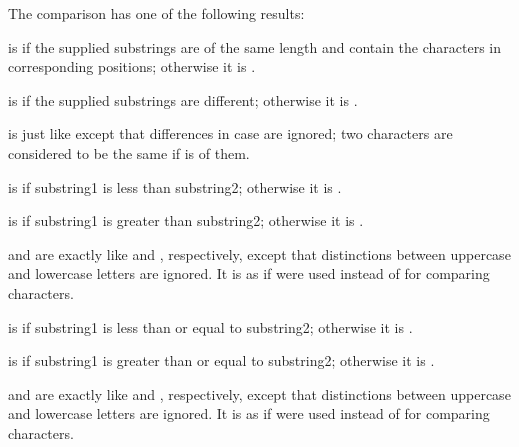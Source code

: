 The comparison has one of the following results:

\beginlist
     

 is  if the supplied substrings are of
the same length and contain the  characters in corresponding
positions; otherwise it is .


 is  if the supplied substrings are 
different; otherwise it is .


 is just like  
except that differences in case are ignored; 
two characters are considered to be the same if  is  of them.
     

 is  if substring1 is less than substring2;
otherwise it is .


 is  if substring1 is greater than substring2;
otherwise it is .


 and  
are exactly like  and , respectively,
except that distinctions between uppercase and lowercase letters are ignored.
It is as if  were used instead of 
for comparing characters.


 is  if substring1 is less than or equal to substring2;
otherwise it is .


 is  if substring1 is greater than or equal to substring2;
otherwise it is .


 and 
are exactly like  and , respectively, 
except that distinctions between uppercase and lowercase letters are ignored.
It is as if  were used instead of 
for comparing characters.

